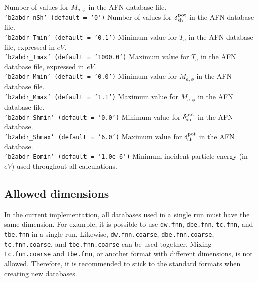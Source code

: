 Number of values for $M_{a,\phi}$ in the AFN database file. \newline
\\
{\tt 'b2abdr\_nSh' (default = '0')} \newline
Number of values for $\delta_{\mathrm{sh}}^{\mathrm{pot}}$ in the AFN database file.  \newline
\\
{\tt 'b2abdr\_Tmin' (default = '0.1')} \newline
Minimum value for $T_a$ in the AFN database file, expressed in $eV$. \newline
\\
{\tt 'b2abdr\_Tmax' (default = '1000.0')} \newline
Maximum value for $T_a$ in the AFN database file, expressed in $eV$. \newline
\\
{\tt 'b2abdr\_Mmin' (default = '0.0')} \newline
Minimum value for $M_{a,\phi}$ in the AFN database file. \newline
\\
{\tt 'b2abdr\_Mmax' (default = '1.1')} \newline
Maximum value for $M_{a,\phi}$ in the AFN database file. \newline
\\
{\tt 'b2abdr\_Shmin' (default = '0.0')} \newline
Minimum value for $\delta_{\mathrm{sh}}^{\mathrm{pot}}$ in the AFN database. \newline
\\
{\tt 'b2abdr\_Shmax' (default = '6.0')} \newline
Maximum value for $\delta_{\mathrm{sh}}^{\mathrm{pot}}$ in the AFN database. \newline
\\
{\tt 'b2abdr\_Eomin' (default = '1.0e-6')} \newline
Minimum incident particle energy (in $eV$) used throughout all calculations. \newline
\\

\subsection{Allowed dimensions}

In the current implementation, all databases used in a single run must have the same dimension. For example, it is possible to use {\tt dw.fnn}, {\tt dbe.fnn}, {\tt tc.fnn}, and {\tt tbe.fnn} in a single run. Likewise, {\tt dw.fnn.coarse}, {\tt dbe.fnn.coarse}, {\tt tc.fnn.coarse}, and {\tt tbe.fnn.coarse} can be used together. Mixing {\tt tc.fnn.coarse} and {\tt tbe.fnn}, or another format with different dimensions, is not allowed. Therefore, it is recommended to stick to the standard formats when creating new databases.

